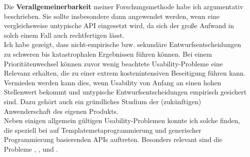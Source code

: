 Die \textbf{Verallgemeinerbarkeit} meiner Forschungsmethode habe ich argumentativ beschrieben. Sie sollte insbesondere dann angewendet werden, wenn eine vergleichsweise untypische API eingesetzt wird, da sich der große Aufwand in solch einem Fall auch rechtfertigen lässt.\\
Ich habe gezeigt, dass nicht-empirische bzw. sekundäre Entwurfsentscheidungen zu schweren bis katastrophalen Ergebnissen führen können. Bei einem Prioritätenwechsel können zuvor wenig beachtete Usability-Probleme eine Relevanz erhalten, die zu einer extrem kostenintensiven Beseitigung führen kann. Vermieden werden kann dies, wenn Usability von Anfang an einen hohen Stellenwert bekommt und untypische Entwurfsentscheidungen empirisch gesichert sind. Dazu gehört auch ein gründliches Studium der (zukünftigen) Anwenderschaft des eigenen Produkts.\\
Neben einigen allgemein gültigen Usability-Problemen konnte ich solche finden, die speziell bei auf Templatemetaprogrammierung und generischer Programmierung basierenden APIs auftreten. Besonders relevant sind die Probleme , ,  und .

